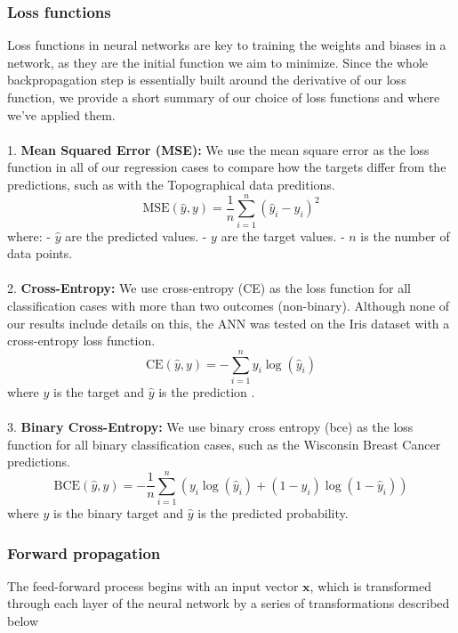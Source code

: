 \subsubsection{Loss functions}\label{sssec:loss_functions}
Loss functions in neural networks are key to training the weights and biases in a network, as they are the 
initial function we aim to minimize. 
Since the whole backpropagation step is essentially built around the derivative of our loss function,
we provide a short summary of our choice of 
loss functions and where we've applied them. 
\\
\\
1. \textbf{Mean Squared Error (MSE):}
We use the mean square error as the loss function in all of our regression cases to compare how the targets differ from the predictions, such
as with the Topographical data preditions. 
   \[
   \text{MSE}(\hat{y}, y) = \frac{1}{n} \sum_{i=1}^{n} (\hat{y}_i - y_i)^2
   \]
   where:
   - \( \hat{y} \) are the predicted values.
   - \( y \) are the target values.
   - \( n \) is the number of data points.
\\
\\
2. \textbf{Cross-Entropy:}
We use cross-entropy (CE) as the loss function for all classification cases with more than two outcomes (non-binary). Although none of our results include
details on this, the ANN was tested on the Iris dataset with a cross-entropy loss function. 
   \[
   \text{CE}(\hat{y}, y) = -\sum_{i=1}^{n} y_i \log(\hat{y}_i)
   \]
   where \( y \) is the target and \( \hat{y} \) is the prediction .
\\
\\
3. \textbf{Binary Cross-Entropy:}
We use binary cross entropy (bce) as the loss function for all binary classification cases, such as the Wisconsin Breast Cancer predictions. 
   \[
   \text{BCE}(\hat{y}, y) = -\frac{1}{n} \sum_{i=1}^{n} \left( y_i \log(\hat{y}_i) + (1 - y_i) \log(1 - \hat{y}_i) \right)
   \]
%
where \( y \) is the binary target and \( \hat{y} \) is the predicted probability.
\\

\subsubsection{Forward propagation}\label{sssec:forward_propagation}


The feed-forward process begins with an input vector \( \mathbf{x} \), which is transformed through each layer 
of the neural network by a series of transformations described below

